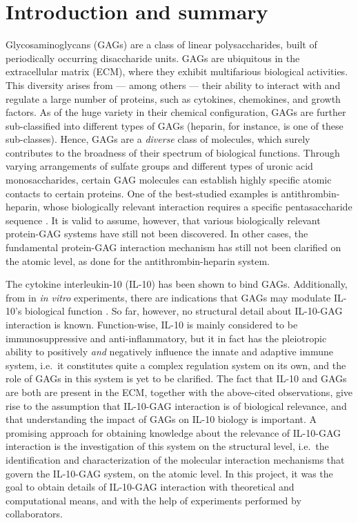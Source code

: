 \chapter{Introduction and summary}



Glycosaminoglycans (GAGs) are a class of linear polysaccharides, built of
periodically occurring disaccharide units. GAGs are ubiquitous in the
extracellular matrix (ECM), where they exhibit multifarious biological
activities. This diversity arises from --- among others --- their ability to
interact with and regulate a large number of proteins, such as cytokines,
chemokines, and growth factors. As of the huge variety in their chemical
configuration, GAGs are further sub-classified into different types of GAGs
(heparin, for instance, is one of these sub-classes). Hence, GAGs are a
\textit{diverse} class of molecules, which surely contributes to the broadness
of their spectrum of biological functions. Through varying arrangements of
sulfate groups and different types of uronic acid monosaccharides, certain GAG
molecules can establish highly specific atomic contacts to certain proteins. One
of the best-studied examples is antithrombin-heparin, whose biologically
relevant interaction requires a specific pentasaccharide sequence
\cite{antithrombin-thrombin-heparin-2004}. It is valid to assume, however, that
various biologically relevant protein-GAG systems have still not been
discovered. In other cases, the fundamental protein-GAG interaction mechanism
has still not been clarified on the atomic level, as done for the
antithrombin-heparin system.

The cytokine interleukin-10 (IL-10) has been shown to bind GAGs. Additionally,
from in \textit{in vitro} experiments, there are indications that GAGs may
modulate IL-10's biological function \cite{salek_ardakani_2000}. So far,
however, no structural detail about IL-10-GAG interaction is known.
Function-wise, IL-10 is mainly considered to be immunosuppressive and
anti-inflammatory, but it in fact has the pleiotropic ability to positively
\textit{and} negatively influence the innate and adaptive immune system, i.e.\
it constitutes quite a complex regulation system on its own, and the role of
GAGs in this system is yet to be clarified. The fact that IL-10 and GAGs are
both are present in the ECM, together with the above-cited observations, give
rise to the assumption that IL-10-GAG interaction is of biological relevance,
and that understanding the impact of GAGs on IL-10 biology is important. A
promising approach for obtaining knowledge about the relevance of IL-10-GAG
interaction is the investigation of this system on the structural level, i.e.\
the identification and characterization of the molecular interaction mechanisms
that govern the IL-10-GAG system, on the atomic level. In this project, it was
the goal to obtain details of IL-10-GAG interaction with theoretical and
computational means, and with the help of experiments performed by
collaborators.

